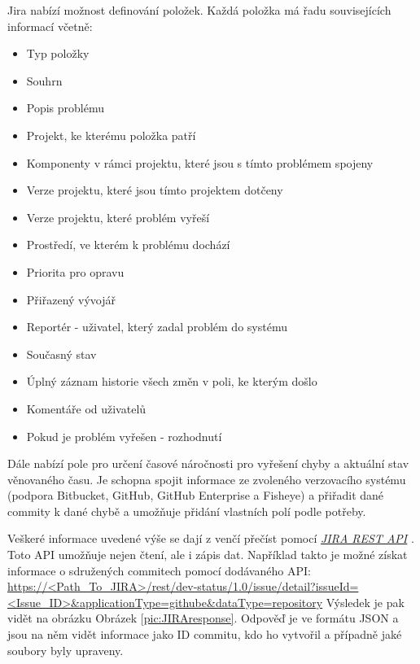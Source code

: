 \documentclass[czech,DP]{thesiskiv}
\begin{document}
Jira nabízí možnost definování položek. Každá položka má řadu souvisejících informací včetně:

\begin{itemize}
\item Typ položky
\item Souhrn
\item Popis problému
\item Projekt, ke kterému položka patří
\item Komponenty v rámci projektu, které jsou s tímto problémem spojeny
\item Verze projektu, které jsou tímto projektem dotčeny
\item Verze projektu, které problém vyřeší
\item Prostředí, ve kterém k problému dochází
\item Priorita pro opravu
\item Přiřazený vývojář
\item Reportér - uživatel, který zadal problém do systému
\item Současný stav
\item Úplný záznam historie všech změn v poli, ke kterým došlo
\item Komentáře od uživatelů
\item Pokud je problém vyřešen - rozhodnutí
\end{itemize}

Dále nabízí pole pro určení časové náročnosti pro vyřešení chyby a aktuální stav věnovaného času. Je schopna spojit informace ze zvoleného verzovacího systému (podpora Bitbucket, GitHub, GitHub Enterprise a Fisheye) a přiřadit dané commity k dané chybě a umožňuje přidání vlastních polí podle potřeby.

Veškeré informace uvedené výše se dají z venčí přečíst pomocí \textit{\href{https://docs.atlassian.com/software/jira/docs/api/REST/5.0-m5/}{JIRA REST API} }. Toto API umožňuje nejen čtení, ale i zápis dat. Například takto je možné získat informace o sdružených commitech pomocí dodávaného API:
\url{https://<Path_To_JIRA>/rest/dev-status/1.0/issue/detail?issueId=<Issue_ID>&applicationType=githube&dataType=repository}
Výsledek je pak vidět na obrázku Obrázek \ref{pic:JIRAresponse}. Odpověď je ve formátu JSON a jsou na něm vidět informace jako ID commitu, kdo ho vytvořil a případně jaké soubory byly upraveny.
\end{document}
